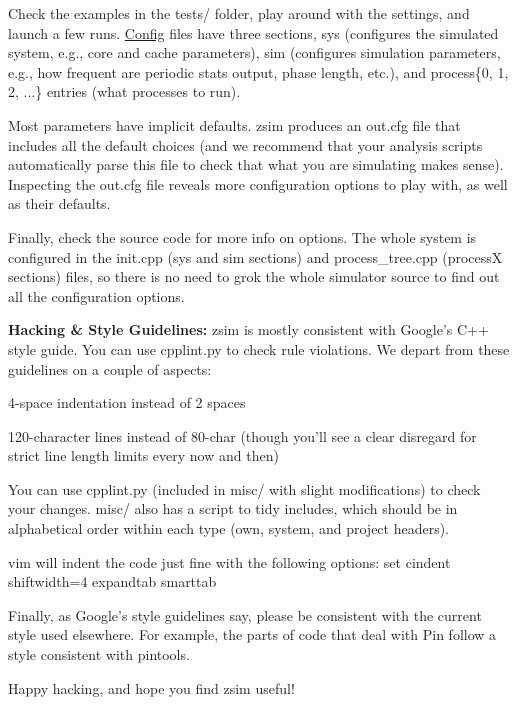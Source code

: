 \begin{DoxyEnumerate}
\item Check the examples in the {\ttfamily tests/} folder, play around with the settings, and launch a few runs. \hyperlink{classConfig}{Config} files have three sections, sys (configures the simulated system, e.\-g., core and cache parameters), sim (configures simulation parameters, e.\-g., how frequent are periodic stats output, phase length, etc.), and process\{0, 1, 2, ...\} entries (what processes to run).
\item Most parameters have implicit defaults. zsim produces an out.\-cfg file that includes all the default choices (and we recommend that your analysis scripts automatically parse this file to check that what you are simulating makes sense). Inspecting the out.\-cfg file reveals more configuration options to play with, as well as their defaults.
\item Finally, check the source code for more info on options. The whole system is configured in the init.\-cpp (sys and sim sections) and process\-\_\-tree.\-cpp (process\-X sections) files, so there is no need to grok the whole simulator source to find out all the configuration options.
\end{DoxyEnumerate}

{\bfseries Hacking \& Style Guidelines\-:} zsim is mostly consistent with Google's C++ style guide. You can use cpplint.\-py to check rule violations. We depart from these guidelines on a couple of aspects\-:


\begin{DoxyItemize}
\item 4-\/space indentation instead of 2 spaces
\item 120-\/character lines instead of 80-\/char (though you'll see a clear disregard for strict line length limits every now and then)
\end{DoxyItemize}

You can use cpplint.\-py (included in misc/ with slight modifications) to check your changes. misc/ also has a script to tidy includes, which should be in alphabetical order within each type (own, system, and project headers).

vim will indent the code just fine with the following options\-: {\ttfamily set cindent shiftwidth=4 expandtab smarttab}

Finally, as Google's style guidelines say, please be consistent with the current style used elsewhere. For example, the parts of code that deal with Pin follow a style consistent with pintools.

Happy hacking, and hope you find zsim useful! 